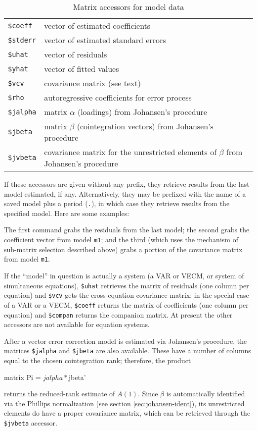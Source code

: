 \begin{table}[htbp]
\centering
\begin{tabular}{ll}
\texttt{\$coeff}  & vector of estimated coefficients \\
\texttt{\$stderr} & vector of estimated standard errors \\
\texttt{\$uhat}   & vector of residuals \\
\texttt{\$yhat}   & vector of fitted values \\
\texttt{\$vcv}    & covariance matrix (see text) \\
\texttt{\$rho}    & autoregressive coefficients for error process \\
\texttt{\$jalpha} & matrix $\alpha$ (loadings) from Johansen's procedure \\
\texttt{\$jbeta}  & matrix $\beta$ (cointegration vectors) from
Johansen's procedure \\
\texttt{\$jvbeta} & covariance matrix for the unrestricted elements of
$\beta$ from Johansen's procedure
\end{tabular}
\caption{Matrix accessors for model data}
\label{tab:matrix-accessors}
\end{table}

If these accessors are given without any prefix, they retrieve results
from the last model estimated, if any.  Alternatively, they may be
prefixed with the name of a saved model plus a period (\texttt{.}), in
which case they retrieve results from the specified model.  Here are
some examples:
%
The first command grabs the residuals from the last model; the second
grabs the coefficient vector from model \texttt{m1}; and the third
(which uses the mechanism of sub-matrix selection described above)
grabs a portion of the covariance matrix from model \texttt{m1}.

If the ``model'' in question is actually a system (a VAR or VECM, or
system of simultaneous equations), \verb|$uhat| retrieves the matrix
of residuals (one column per equation) and \verb|$vcv| gets the
cross-equation covariance matrix; in the special case of a VAR or a
VECM, \verb|$coeff| returns the matrix of coefficients (one column per
equation) and \verb|$compan| returns the companion matrix.  At present
the other accessors are not available for equation systems.

After a vector error correction model is estimated via Johansen's
procedure, the matrices \verb|$jalpha| and \verb|$jbeta| are
also available. These have a number of columns equal to the chosen
cointegration rank; therefore, the product
\begin{code}
matrix Pi = $jalpha * $jbeta'
\end{code}
returns the reduced-rank estimate of $A(1)$. Since $\beta$ is
automatically identified via the Phillips normalization (see section
\ref{sec:johansen-ident}), its unrestricted elements do have a proper
covariance matrix, which can be retrieved through the
\verb|$jvbeta| accessor.

